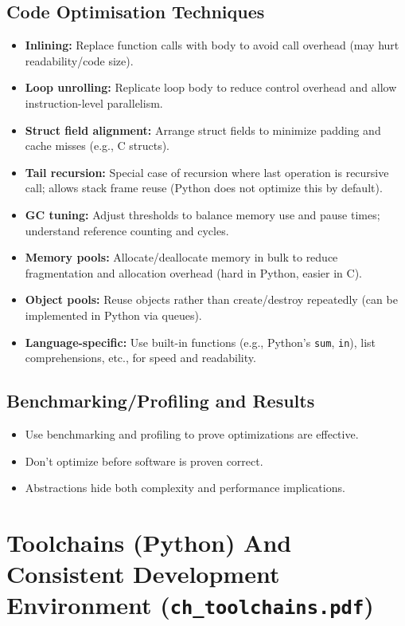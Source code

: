 \documentclass[11pt,a4paper]{article}
\begin{document}
\subsection*{Code Optimisation Techniques}
\begin{itemize}
    \item \textbf{Inlining:} Replace function calls with body to avoid call overhead (may hurt readability/code size).
    \item \textbf{Loop unrolling:} Replicate loop body to reduce control overhead and allow instruction-level parallelism.
    \item \textbf{Struct field alignment:} Arrange struct fields to minimize padding and cache misses (e.g., C structs).
    \item \textbf{Tail recursion:} Special case of recursion where last operation is recursive call; allows stack frame reuse (Python does not optimize this by default).
    \item \textbf{GC tuning:} Adjust thresholds to balance memory use and pause times; understand reference counting and cycles.
    \item \textbf{Memory pools:} Allocate/deallocate memory in bulk to reduce fragmentation and allocation overhead (hard in Python, easier in C).
    \item \textbf{Object pools:} Reuse objects rather than create/destroy repeatedly (can be implemented in Python via queues).
    \item \textbf{Language-specific:} Use built-in functions (e.g., Python’s \texttt{sum}, \texttt{in}), list comprehensions, etc., for speed and readability.
\end{itemize}

\subsection*{Benchmarking/Profiling and Results}
\begin{itemize}
    \item Use benchmarking and profiling to prove optimizations are effective.
    \item Don’t optimize before software is proven correct.
    \item Abstractions hide both complexity and performance implications.
\end{itemize}

\section{Toolchains (Python) And Consistent Development Environment (\texttt{ch\_toolchains.pdf})}
\end{document}
